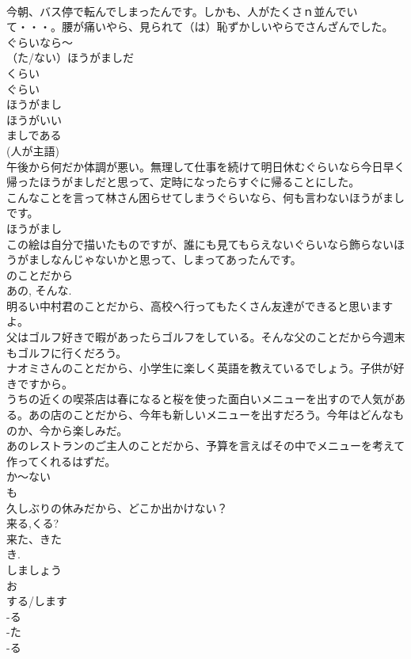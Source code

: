 \documentclass[8pt]{extreport}
\begin{document}
\begin{CJK}{UTF8}{min}
\\	今朝、バス停で転んでしまったんです。しかも、人がたくさｎ並んでいて・・・。腰が痛いやら、見られて（は）恥ずかしいやらでさんざんでした。	
\\	ぐらいなら～
\\	（た/ない）ほうがましだ
\\	くらい 
\\	ぐらい
\\	ほうがまし 
\\	ほうがいい
\\	ましである
\\	(人が主語) 
\\	午後から何だか体調が悪い。無理して仕事を続けて明日休むぐらいなら今日早く帰ったほうがましだと思って、定時になったらすぐに帰ることにした。
\\	こんなことを言って林さん困らせてしまうぐらいなら、何も言わないほうがましです。
\\	ほうがまし 
\\	この絵は自分で描いたものですが、誰にも見てもらえないぐらいなら飾らないほうがましなんじゃないかと思って、しまってあったんです。
\\	のことだから
\\	あの, そんな.
\\	明るい中村君のことだから、高校へ行ってもたくさん友達ができると思いますよ。
\\	父はゴルフ好きで暇があったらゴルフをしている。そんな父のことだから今週末もゴルフに行くだろう。
\\	ナオミさんのことだから、小学生に楽しく英語を教えているでしょう。子供が好きですから。
\\	うちの近くの喫茶店は春になると桜を使った面白いメニューを出すので人気がある。あの店のことだから、今年も新しいメニューを出すだろう。今年はどんなものか、今から楽しみだ。
\\	あのレストランのご主人のことだから、予算を言えばその中でメニューを考えて作ってくれるはずだ。
\\	か～ない
\\	も 
\\	久しぶりの休みだから、どこか出かけない？	
\\	来る,くる?
\\	来た、きた	
\\	き.		
\\	しましょう			
\\	お 
\\	する/します 
\\	-る 
\\	-た		
\\	-る 

\end{CJK}
\end{document}
